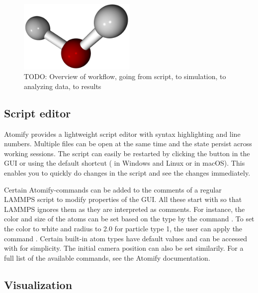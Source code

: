 \documentclass[aps,pre,twocolumn,letterpaper,floatfix,nofootinbib]{revtex4}
\begin{document}
\begin{figure}
	\centering
	\includegraphics[width=0.5\textwidth]{final_billboard.png}
	\caption{TODO: Overview of workflow, going from script, to simulation, to analyzing data, to results}
	\label{fig:gui}
\end{figure}


\subsection{Script editor}

Atomify provides a lightweight script editor with syntax highlighting and line
numbers.
Multiple files can be open at the same time and the state persist across working sessions.
The script can easily be restarted by clicking the button in the GUI or using
the default shortcut ( in Windows and Linux or  in macOS).
This enables you to quickly do changes in the script and see the changes immediately. 

Certain Atomify-commands can be added to the comments of a regular LAMMPS script
to modify properties of the GUI. All these start with \keys{\texttt{\#}} so that
LAMMPS ignores them as they are interpreted as comments.
For instance, the color and size of the atoms can be set based on the type by
the command .
To set the color to white and radius to 2.0 for particle type 1,
the user can apply the command . Certain built-in atom
types have default values and can be accessed with  for simplicity.
The initial camera position can also be set similarily.
For a full list of the available commands, see the Atomify documentation\cite{atomifydocumentation}.

\subsection{Visualization}
\end{document}
